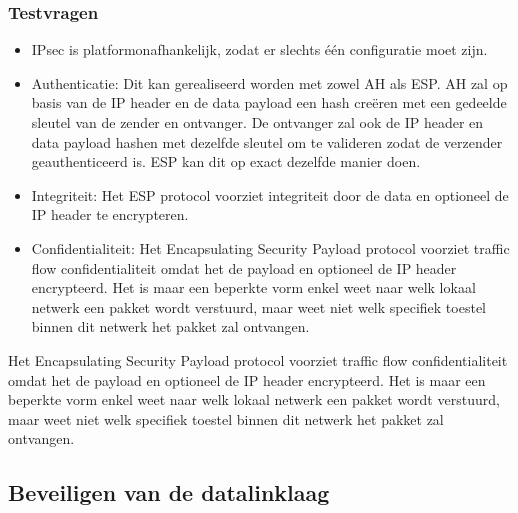 \documentclass{report}
\begin{document}
	\subsubsection{Testvragen}
	\begin{enumerate}
		{
			\begin{itemize}
				\item IPsec is platformonafhankelijk, zodat er slechts één configuratie moet zijn.
			\end{itemize}
		}
		{
			\begin{itemize}
				\item Authenticatie: Dit kan gerealiseerd worden met zowel AH als ESP. AH zal op basis van de IP header en de data payload een hash creëren met een gedeelde sleutel van de zender en ontvanger. De ontvanger zal ook de IP header en data payload hashen met dezelfde sleutel om te valideren zodat de verzender geauthenticeerd is. ESP kan dit op exact dezelfde manier doen.
				\item Integriteit: Het ESP protocol voorziet integriteit door de data en optioneel de IP header te encrypteren.
				\item Confidentialiteit: Het Encapsulating Security Payload protocol voorziet traffic flow confidentialiteit omdat het de payload en optioneel de IP header encrypteerd. Het is maar een beperkte vorm enkel weet naar welk lokaal netwerk een pakket wordt verstuurd, maar weet niet welk specifiek toestel binnen dit netwerk het pakket zal ontvangen.
			\end{itemize}
		}

		{
		Het Encapsulating Security Payload protocol voorziet traffic flow confidentialiteit omdat het de payload en optioneel de IP header encrypteerd. Het is maar een beperkte vorm enkel weet naar welk lokaal netwerk een pakket wordt verstuurd, maar weet niet welk specifiek toestel binnen dit netwerk het pakket zal ontvangen.
		}
	\end{enumerate}

	\subsection{Beveiligen van de datalinklaag}
\end{document}
